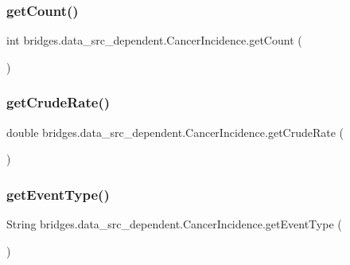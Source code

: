 \subsubsection{\texorpdfstring{get\+Count()}{getCount()}}
{\footnotesize\ttfamily int bridges.\+data\+\_\+src\+\_\+dependent.\+Cancer\+Incidence.\+get\+Count (\begin{DoxyParamCaption}{ }\end{DoxyParamCaption})}

\hypertarget{classbridges_1_1data__src__dependent_1_1_cancer_incidence_afc2ddb3099dffc46371ad7188278501d}{}\label{classbridges_1_1data__src__dependent_1_1_cancer_incidence_afc2ddb3099dffc46371ad7188278501d} 
\subsubsection{\texorpdfstring{get\+Crude\+Rate()}{getCrudeRate()}}
{\footnotesize\ttfamily double bridges.\+data\+\_\+src\+\_\+dependent.\+Cancer\+Incidence.\+get\+Crude\+Rate (\begin{DoxyParamCaption}{ }\end{DoxyParamCaption})}

\hypertarget{classbridges_1_1data__src__dependent_1_1_cancer_incidence_a844c6c3317bdb6b124f32b40804e1ff7}{}\label{classbridges_1_1data__src__dependent_1_1_cancer_incidence_a844c6c3317bdb6b124f32b40804e1ff7} 
\subsubsection{\texorpdfstring{get\+Event\+Type()}{getEventType()}}
{\footnotesize\ttfamily String bridges.\+data\+\_\+src\+\_\+dependent.\+Cancer\+Incidence.\+get\+Event\+Type (\begin{DoxyParamCaption}{ }\end{DoxyParamCaption})}

